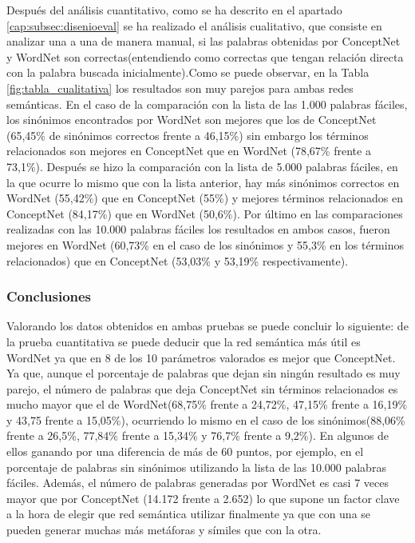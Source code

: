Después del análisis cuantitativo, como se ha descrito en el apartado \ref{cap:subsec:disenioeval} se ha realizado el análisis cualitativo, que consiste en analizar una a una de manera manual, si las palabras obtenidas por ConceptNet y WordNet son correctas(entendiendo como correctas que tengan relación directa con la palabra buscada inicialmente).Como se puede observar, en la Tabla \ref{fig:tabla_cualitativa} los resultados son muy parejos para ambas redes semánticas. En el caso de la comparación con la lista de las 1.000 palabras fáciles, los sinónimos encontrados por WordNet son mejores que los de ConceptNet (65,45\% de sinónimos correctos frente a 46,15\%) sin embargo los términos relacionados son mejores en ConceptNet que en WordNet (78,67\% frente a 73,1\%). Después se hizo la comparación con la lista de 5.000 palabras fáciles, en la que ocurre lo mismo que con la lista anterior, hay más sinónimos correctos en WordNet (55,42\%) que en ConceptNet (55\%) y mejores términos relacionados en ConceptNet (84,17\%) que en WordNet (50,6\%). Por último en las comparaciones realizadas con las 10.000 palabras fáciles los resultados en ambos casos, fueron mejores en WordNet (60,73\% en el caso de los sinónimos y 55,3\% en los términos relacionados) que en ConceptNet (53,03\% y 53,19\% respectivamente).


\subsubsection{Conclusiones}
\label{sssec:conclusionPruebas}

Valorando los datos obtenidos en ambas pruebas se puede concluir lo siguiente: de la prueba cuantitativa se puede deducir que la red semántica más útil es WordNet ya que en 8 de los 10 parámetros valorados es mejor que ConceptNet. Ya que, aunque el porcentaje de palabras que dejan sin ningún resultado es muy parejo, el número de palabras que deja ConceptNet sin términos relacionados es mucho mayor que el de WordNet(68,75\% frente a 24,72\%, 47,15\% frente a 16,19\% y 43,75 frente a 15,05\%), ocurriendo lo mismo en el caso de los sinónimos(88,06\% frente a 26,5\%, 77,84\% frente a 15,34\% y 76,7\% frente a 9,2\%). En algunos de ellos ganando por una diferencia de más de 60 puntos, por ejemplo, en el porcentaje de palabras sin sinónimos utilizando la lista de las 10.000 palabras fáciles. Además, el número de palabras generadas por WordNet es casi 7 veces mayor que por ConceptNet (14.172 frente a 2.652) lo que supone un factor clave a la hora de elegir que red semántica utilizar finalmente ya que con una se pueden generar muchas más metáforas y símiles que con la otra.

